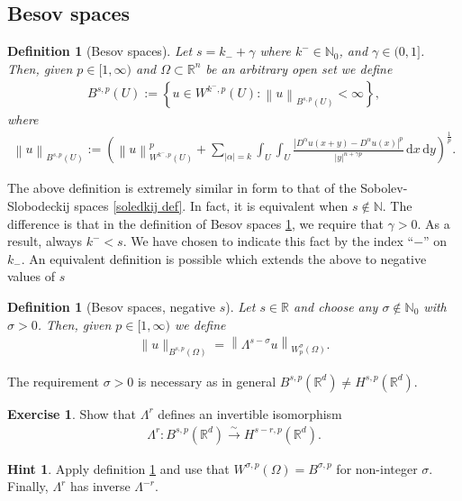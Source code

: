 \documentclass[
    a4paper,
    DIV=14,
    abstract=true,
    numbers=noenddot
]
{scrartcl}
\newtheorem{definition}[theorem]{Definition}
\theoremstyle{definition}
\newtheorem{exercise}{Exercise}
\newtheorem*{hint}{Hint}
\newcommand{\set}[1]{\left\{#1\right\}}
\renewcommand{\norm}[1]{\left\lVert #1 \right\rVert}\renewcommand{\abs}[1]{\left| #1 \right|}
\newcommand{\iso}{\xrightarrow{\sim}}
\renewcommand{\d}{\,\mathrm{d}}\newcommand{\dx}{\,\mathrm{d}x}
\newcommand{\N}{\mathbb{N}}
\newcommand{\R}{\mathbb{R}}
\begin{document}
\subsection{Besov spaces}
\begin{definition}[Besov spaces]\label{besov def}
    Let $s=k_{-}+\gamma$ where $k^{-} \in \N_0$, and $\gamma \in (0,1]$. Then, given  $p \in [1,\infty)$ and $\Omega  \subset \R^n$ be an arbitrary open set we define
    \begin{align*}
        B^{s ,p}(U):= \set{u \in W^{k^{-} ,p}(U): \norm{u}_{B^{s,p}(U)}<\infty},
    \end{align*}
    where
    \begin{align*}
        \norm{u}_{B^{s,p}(U)}:= \left(\norm{u}_{W^{k^{-},p}(U)}^p+ \sum_{\abs{\alpha}=k }\int_{U}\int_{U}\frac{\abs{D^\alpha u(x+y)-D^\alpha u(x)}^p}{\abs{y}^{n+\gamma p}}\d x \d y\right)^\frac{1}{p}.
    \end{align*}
\end{definition}
The above definition is extremely similar in form to that of the Sobolev-Slobodeckij spaces \ref{soledkij def}. In fact, it is equivalent when $s \notin \N$. The difference is that in the definition of Besov spaces \ref{besov def}, we require that $\gamma >0$. As a result, always $k^{-}<s$. We have chosen to indicate this fact by the index ``$-$'' on $k_{-}$. An equivalent definition is possible which extends the above to negative values of $s$
\begin{definition}[Besov spaces, negative $s$]\label{besov def negative}
    Let $s \in \R$ and choose any $\sigma \not\in \N_0$ with $\sigma >0$. Then, given  $p \in [1,\infty)$ we define
    \begin{align*}
        \|u\|_{B^{s,p}(\Omega)}=\left\|\Lambda^{s-\sigma} u\right\|_{W_p^\sigma(\Omega)}.
    \end{align*}
\end{definition}
The requirement $\sigma >0$ is necessary as in general $B^{s,p}(\R^d)\neq H^{s,p}(\R^d)$.
\begin{exercise}
    Show that $\Lambda ^r$ defines an invertible isomorphism
    \begin{align*}
        \Lambda ^r: B^{s,p}(\R^d)\iso H^{s-r,p}(\R^d).
    \end{align*}
\end{exercise}
\begin{hint}
    Apply definition \ref{besov def negative} and use that $W^{\sigma,p}(\Omega )= B^{\sigma,p } $ for non-integer $\sigma$. Finally,   $\Lambda^r$ has inverse $\Lambda^{-r}$.
\end{hint}
\end{document}
